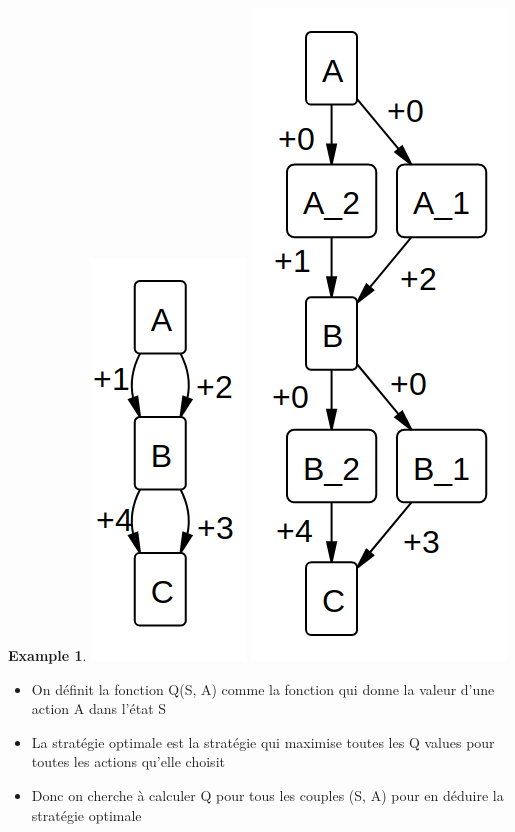 \documentclass{beamer}	%
\theoremstyle{plain}
\theoremstyle{definition}
\newtheorem{ex}{Example}[section]
\theoremstyle{remark}
\numberwithin{equation}{section}
\begin{document}
\begin{frame}

\begin{ex}
\centering
\includegraphics[width=0.30
\textwidth,height=0.6\textheight]{photo/1joueurV.png}
\includegraphics[width=0.30
\textwidth,height=0.6\textheight]{photo/1joueur.png}
\end{ex}
\end{frame}

\begin{frame}

\begin{itemize}
    \item On définit la fonction Q(S, A) comme la fonction qui donne la valeur d'une action A dans l'état S
    \item La stratégie optimale est la stratégie qui maximise toutes les Q values pour toutes les actions qu'elle choisit
    \item Donc on cherche à calculer Q pour tous les couples (S, A) pour en déduire la stratégie optimale
\end{itemize}

\end{frame}
\end{document}
